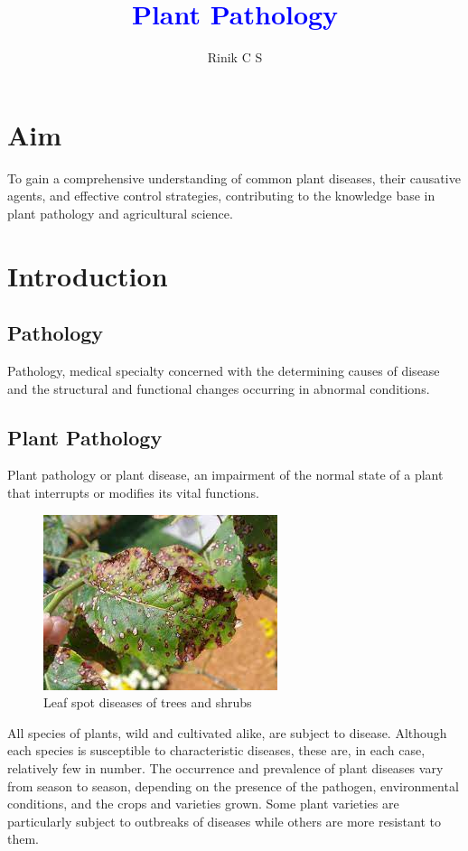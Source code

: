 \documentclass[a4paper,12pt]{article}
\author{\large{Rinik C S}}
\title{\textcolor{blue}{\huge{Plant Pathology}}}
\begin{document}
\pagecolor{yellow}\afterpage{\nopagecolor}
\maketitle
\newpage



\tableofcontents

\newpage
\section{Aim}
To gain a comprehensive understanding of common plant diseases, their causative agents, and effective control strategies, contributing to the knowledge base in plant pathology and agricultural science.
\section{Introduction}
 \subsection{Pathology}
 Pathology, medical specialty concerned with the determining causes of disease and the structural and functional changes occurring in abnormal conditions.
\subsection{Plant Pathology}
Plant pathology or plant disease, an impairment of the normal state of a plant that interrupts or modifies its vital functions.\\
\begin{figure}
\includegraphics[scale=0.5]{leaf}
\caption{Leaf spot diseases of trees and shrubs}
\end{figure}
 All species of plants, wild and cultivated alike, are subject to disease. Although each species is susceptible to characteristic diseases, these are, in each case, relatively few in number. The occurrence and prevalence of plant diseases vary from season to season, depending on the presence of the pathogen, environmental conditions, and the crops and varieties grown. Some plant varieties are particularly subject to outbreaks of diseases while others are more resistant to them.
 
\end{document}

